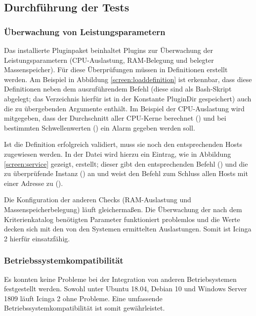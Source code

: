 \subsection{Durchführung der Tests}
\label{sec:DurchführungTests}

\subsubsection{Überwachung von Leistungsparametern}
\label{sec:ÜberwachungLeistungsparameter}
Das installierte Pluginpaket  beinhaltet Plugins zur Überwachung der Leistungsparametern (CPU-Auslastung, RAM-Belegung und belegter Massenspeicher). Für diese Überprüfungen müssen in  Definitionen erstellt werden. Am Beispiel in Abbildung \ref{screen:loaddefinition} ist erkennbar, dass diese Definitionen neben dem auszuführendem Befehl (diese sind als Bash-Skript abgelegt; das Verzeichnis hierfür ist in der Konstante \glqq{}PluginDir\grqq{} gespeichert) auch die zu übergebenden Argumente enthält. Im Beispiel der CPU-Auslastung wird mitgegeben, dass der Durchschnitt aller CPU-Kerne berechnet () und bei bestimmten Schwellenwerten () ein Alarm gegeben werden soll.

Ist die Definition erfolgreich validiert, muss sie noch den entsprechenden Hosts zugewiesen werden. In der Datei  wird hierzu ein Eintrag, wie in Abbildung \ref{screen:service} gezeigt, erstellt; dieser gibt den entsprechenden Befehl () und die zu überprüfende Instanz () an und weist den Befehl zum Schluss allen Hosts mit einer Adresse zu ().

Die Konfiguration der anderen Checks (RAM-Auslastung und Massenspeicherbelegung) läuft gleichermaßen. Die Überwachung der nach dem Kriterienkatalog benötigten Parameter funktioniert problemlos und die Werte decken sich mit den von den Systemen ermittelten Auslastungen. Somit ist \glqq{}Icinga 2\grqq{} hierfür einsatzfähig.

\subsubsection{Betriebssystemkompatibilität}
\label{sec:oscompatibility}
Es konnten keine Probleme bei der Integration von anderen Betriebsystemen festgestellt werden. Sowohl unter Ubuntu 18.04, Debian 10 und Windows Server 1809 läuft \glqq{}Icinga 2\grqq{} ohne Probleme. Eine umfassende Betriebssystemkompatibilität ist somit gewährleistet.

